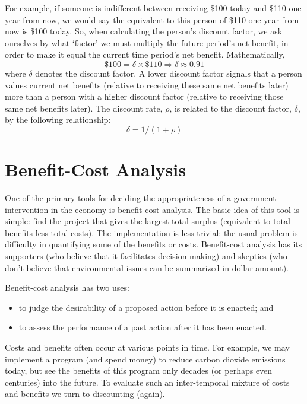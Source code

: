 \documentclass[
]{book}
\providecommand{\tightlist}{%
  \setlength{\itemsep}{0pt}\setlength{\parskip}{0pt}}
\begin{document}
For example, if someone is indifferent between receiving \$100 today and \$110 one year from now, we would say the equivalent to this person of \$110 one year from now is \$100 today.
So, when calculating the person's discount factor, we ask ourselves by what `factor' we must multiply the future period's net benefit, in order to make it equal the current time period's net benefit. Mathematically, \[\$100=\delta\times\$110 \Rightarrow \delta \approx 0.91\] where \(\delta\) denotes the discount factor. A lower discount factor signals that a person values current net benefits (relative to receiving these same net benefits later) more than a person with a higher discount factor (relative to receiving those same net benefits later). The discount rate, \(\rho\), is related to the discount factor, \(\delta\), by the following relationship: \[\delta = 1/(1+\rho)\]

\hypertarget{benefit-cost-analysis}{%
\section{Benefit-Cost Analysis}\label{benefit-cost-analysis}}

One of the primary tools for deciding the appropriateness of a government intervention in the economy is benefit-cost analysis. The basic idea of this tool is simple: find the project that gives the largest total surplus (equivalent to total benefits less total costs). The implementation is less trivial: the usual problem is difficulty in quantifying some of the benefits or costs.
Benefit-cost analysis has its supporters (who believe that it facilitates decision-making) and skeptics (who don't believe that environmental issues can be summarized in dollar amount).

Benefit-cost analysis has two uses:

\begin{itemize}
\tightlist
\item
  to judge the desirability of a proposed action before it is enacted; and
\item
  to assess the performance of a past action after it has been enacted.
\end{itemize}

Costs and benefits often occur at various points in time. For example, we may implement a program (and spend money) to reduce carbon dioxide emissions today, but see the benefits of this program only decades (or perhaps even centuries) into the future.
To evaluate such an inter-temporal mixture of costs and benefits we turn to discounting (again).
\end{document}
